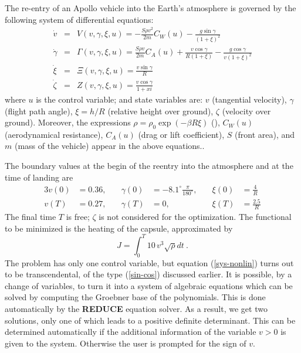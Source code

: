 \documentclass[12pt,a4paper]{article}
\newcommand{\REDUCE}{{\sf\bf REDUCE}}
\begin{document}
The re-entry of an Apollo vehicle into the Earth's atmosphere is
governed by the following system of differential equations:
\begin{eqnarray}
  \dot v &=& V(v,\gamma,\xi,u) = - \frac{S \rho v^{2}}{2m} C_{W}(u) -
             \frac{g \sin \gamma}{(1+\xi)^{2}}\\
  \dot \gamma &=& \Gamma(v,\gamma,\xi,u) = \frac{S \rho v}{2m}
             C_{A}(u) + \frac {v \cos \gamma}{R(1+\xi)}
             - \frac{g \cos \gamma}{v(1+\xi)^{2}}\\
  \dot \xi &=& \Xi(v,\gamma,\xi,u) = \frac{v\sin\gamma}{R} \\
  \dot \zeta &=& Z(v,\gamma,\xi,u) = \frac{v \cos \gamma}{1+xi}
\end{eqnarray}
where $u$ is the control variable; and state variables are: $v$
(tangential velocity), $\gamma$ (flight path angle), $\xi = h/R$
(relative height over ground), $\zeta$ (velocity over ground).
Moreover, the expressions $\rho = \rho_{0} \exp(-\beta R \xi)$ (),
$C_{W}(u)$ (aerodynamical resistance), $C_{A}(u)$ (drag or lift
coefficient), $S$ (front area), and $m$ (mass of the vehicle) appear
in the above equations..

The boundary values at the begin of the reentry into the atmosphere
and at the time of landing are
\begin{alignat}{3}
 v(0) &= 0.36,& \quad
 \gamma(0) &= -8.1^{\circ} \frac{\pi}{180^{\circ}},& \quad
 \xi(0) &= \frac{4}{R}\\
 v(T) &= 0.27,& \quad
 \gamma(T) &= 0,& \quad
 \xi(T) &= \frac{2.5}{R}
\end{alignat}
The final time $T$ is free; $\zeta$ is not considered for the
optimization. The functional to be minimized is the heating of the
capsule, approximated by
\begin{equation}
  J = \int_{0}^{T} 10\, v^{3} \sqrt{\rho} dt \:.
\end{equation}
The problem has only one control variable, but equation
(\ref{sys-nonlin}) turns out to be transcendental, of the type
(\ref{sin-cos}) discussed earlier. It is possible, by a
change of variables, to turn it into a system of algebraic equations
which can be solved by computing the Groebner base of the polynomials.
This is done automatically by the \REDUCE{} equation solver. As a
result, we get two solutions, only one of which leads to a positive
definite determinant. This can be determined automatically if the
additional information of the variable $v > 0$ is given to the system.
Otherwise the user is prompted for the sign of $v$.
\end{document}
